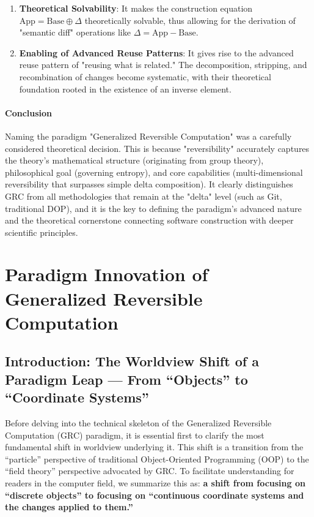 \documentclass[11pt]{article}
\begin{document}
\begin{enumerate}
    \item   \textbf{Theoretical Solvability}: It makes the construction equation $\text{App} = \text{Base} \oplus \Delta$ theoretically solvable, thus allowing for the derivation of "semantic diff" operations like $\Delta = \text{App} - \text{Base}$.

    \item   \textbf{Enabling of Advanced Reuse Patterns}: It gives rise to the advanced reuse pattern of "reusing what is related." The decomposition, stripping, and recombination of changes become systematic, with their theoretical foundation rooted in the existence of an inverse element.
\end{enumerate}

\paragraph{Conclusion} Naming the paradigm "Generalized Reversible Computation" was a carefully considered theoretical decision. This is because "reversibility" accurately captures the theory's mathematical structure (originating from group theory), philosophical goal (governing entropy), and core capabilities (multi-dimensional reversibility that surpasses simple delta composition). It clearly distinguishes GRC from all methodologies that remain at the "delta" level (such as Git, traditional DOP), and it is the key to defining the paradigm's advanced nature and the theoretical cornerstone connecting software construction with deeper scientific principles.

\section{Paradigm Innovation of Generalized Reversible Computation}
\label{sec:paradigm-innovation}

\subsection{Introduction: The Worldview Shift of a Paradigm Leap — From ``Objects'' to ``Coordinate Systems''}
\label{subsec:introduction-worldview-shift}

Before delving into the technical skeleton of the Generalized Reversible Computation (GRC) paradigm, it is essential first to clarify the most fundamental shift in worldview underlying it. This shift is a transition from the ``particle'' perspective of traditional Object-Oriented Programming (OOP) to the ``field theory'' perspective advocated by GRC. To facilitate understanding for readers in the computer field, we summarize this as: \textbf{a shift from focusing on ``discrete objects'' to focusing on ``continuous coordinate systems and the changes applied to them.''}
\end{document}
